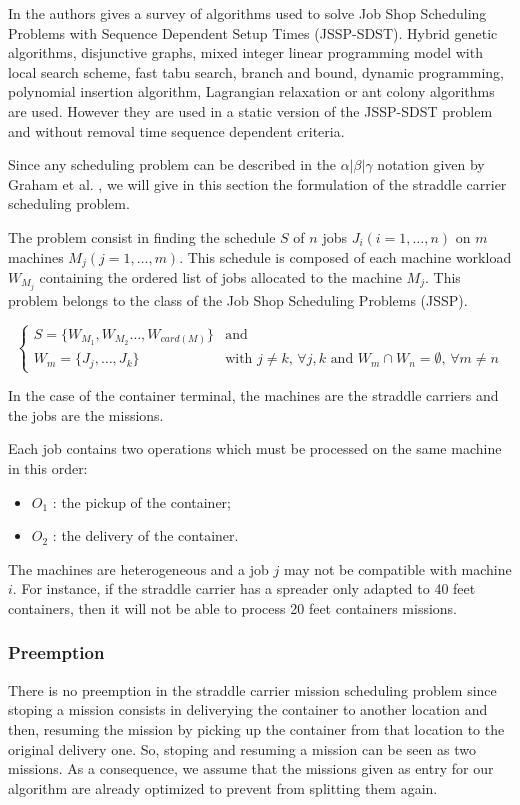 \documentclass[a4paper,10pt]{article}
\begin{document}
In \cite{Allahverdi2008} the authors gives a survey of algorithms used to solve Job Shop Scheduling Problems with Sequence Dependent Setup Times (JSSP-SDST). Hybrid genetic algorithms, disjunctive graphs, mixed integer linear programming model with local search scheme, fast tabu search, branch and bound, dynamic programming, polynomial insertion algorithm, Lagrangian relaxation or ant colony algorithms are used. However they are used in a static version of the JSSP-SDST problem and without removal time sequence dependent criteria.

Since any scheduling problem can be described in the $\alpha|\beta|\gamma$ notation given by Graham et al. \cite{Graham1979}, we will give in this section the formulation of the straddle carrier scheduling problem.

The problem consist in finding the schedule $S$ of $n$ jobs $J_i(i=1,\ldots,n)$ on $m$ machines $M_j(j=1,\ldots,m)$. 
This schedule is composed of each machine workload $W_{M_j}$ containing the ordered list of jobs allocated to the machine $M_j$. This problem belongs to the class of the Job Shop Scheduling Problems (JSSP).

\begin{equation*}
\begin{cases}
 S = \{ W_{M_1} , W_{M_2} \ldots , W_{card(M)}\} & \text{and}\\
 W_{m} = \{ J_j , \ldots , J_k \} & \text{with $j \neq k$, $\forall j,k$ and $W_{m} \cap W_{n} = \emptyset$,  $\forall m \neq n$} 
\end{cases}
\end{equation*}

In the case of the container terminal, the machines are the straddle carriers and the jobs are the missions.
 
Each job contains two operations which must be processed on the same machine in this order:
\begin{itemize}
 \item $O_1$ : the pickup of the container;
 \item $O_2$ : the delivery of the container.
\end{itemize}

The machines are heterogeneous and a job $j$ may not be compatible with machine $i$. For instance, if the straddle carrier has a spreader only adapted to 40 feet containers, then it will not be able to process 20 feet containers missions.

\subsubsection{Preemption}
There is no preemption in the straddle carrier mission scheduling problem since stoping a mission consists in deliverying the container to another location and then, resuming the mission by picking up the container from that location to the original delivery one. So, stoping and resuming a mission can be seen as two missions. As a consequence, we assume that the missions given as entry for our algorithm are already optimized to prevent from splitting them again.
\end{document}

